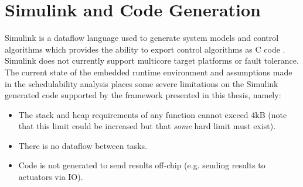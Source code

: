 \section{Simulink and Code Generation}
\label{s:simulink}
	Simulink is a dataflow language used to generate system models and control algorithms which provides the ability to export control algorithms as C code \cite{simulink}. 
	Simulink does not currently support multicore target platforms or fault tolerance. 
	The current state of the embedded runtime environment and assumptions made in the schedulability analysis places some severe limitations on the Simulink generated code supported by the framework presented in this thesis, namely:
\begin{itemize}
  \item The stack and heap requirements of any function cannot exceed 4kB (note that this limit could be increased but that \emph{some} hard limit must exist).
  \item There is no dataflow between tasks.
  \item Code is not generated to send results off-chip (e.g. sending results to actuators via IO).
\end{itemize}



